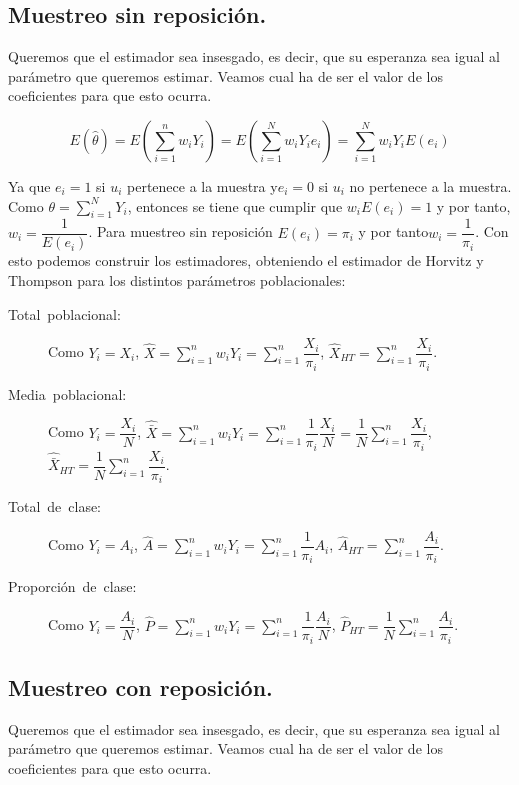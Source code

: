 \subsection{Muestreo sin reposici\'on.}

Queremos que el estimador sea insesgado, es decir, que su esperanza
sea igual al par\'ametro que queremos estimar. Veamos cual ha de ser
el valor de los coeficientes para que esto ocurra.

\[
E\left(\hat{\theta}\right)=E\left(\sum_{i=1}^{n}w_{i}Y_{i}\right)=E\left(\sum_{i=1}^{N}w_{i}Y_{i}e_{i}\right)=\sum_{i=1}^{N}w_{i}Y_{i}E\left(e_{i}\right)
\]


Ya que $e_{i}=1$ si $u_{i}$ pertenece a la muestra y$e_{i}=0$ si
$u_{i}$ no pertenece a la muestra. Como $\theta=\sum_{i=1}^{N}Y_{i}$,
entonces se tiene que cumplir que $w_{i}E\left(e_{i}\right)=1$ y
por tanto, $w_{i}=\dfrac{1}{E\left(e_{i}\right)}$. Para muestreo
sin reposici\'on $E\left(e_{i}\right)=\pi_{i}$ y por tanto$w_{i}=\dfrac{1}{\pi_{i}}$.
Con esto podemos construir los estimadores, obteniendo el estimador
de Horvitz y Thompson para los distintos par\'ametros poblacionales:
\begin{description}
\item [{Total~poblacional:}] Como $Y_{i}=X_{i}$, $\hat{X}=\sum_{i=1}^{n}w_{i}Y_{i}=\sum_{i=1}^{n}\dfrac{X_{i}}{\pi_{i}}$,
$\hat{X}_{HT}=\sum_{i=1}^{n}\dfrac{X_{i}}{\pi_{i}}$.
\item [{Media~poblacional:}] Como $Y_{i}=\dfrac{X_{i}}{N}$, $\hat{\bar{X}}=\sum_{i=1}^{n}w_{i}Y_{i}=\sum_{i=1}^{n}\dfrac{1}{\pi_{i}}\dfrac{X_{i}}{N}=\dfrac{1}{N}\sum_{i=1}^{n}\dfrac{X_{i}}{\pi_{i}}$,
$\hat{\bar{X}}_{HT}=\dfrac{1}{N}\sum_{i=1}^{n}\dfrac{X_{i}}{\pi_{i}}$.
\item [{Total~de~clase:}] Como $Y_{i}=A_{i}$, $\hat{A}=\sum_{i=1}^{n}w_{i}Y_{i}=\sum_{i=1}^{n}\dfrac{1}{\pi_{i}}A_{i}$,
$\hat{A}_{HT}=\sum_{i=1}^{n}\dfrac{A_{i}}{\pi_{i}}$.
\item [{Proporci\'on~de~clase:}] Como $Y_{i}=\dfrac{A_{i}}{N}$, $\hat{P}=\sum_{i=1}^{n}w_{i}Y_{i}=\sum_{i=1}^{n}\dfrac{1}{\pi_{i}}\dfrac{A_{i}}{N}$,
$\hat{P}_{HT}=\dfrac{1}{N}\sum_{i=1}^{n}\dfrac{A_{i}}{\pi_{i}}$.
\end{description}

\subsection{Muestreo con reposici\'on.}

Queremos que el estimador sea insesgado, es decir, que su esperanza
sea igual al par\'ametro que queremos estimar. Veamos cual ha de ser
el valor de los coeficientes para que esto ocurra.

